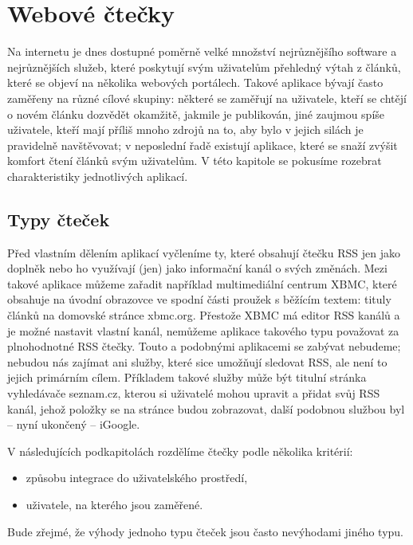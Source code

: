 \chapter{Webové čtečky}


Na internetu je dnes dostupné poměrně velké množství nejrůznějšího software a nejrůznějších služeb, které poskytují svým uživatelům přehledný výtah z článků, které se objeví na několika webových portálech.
Takové aplikace bývají často zaměřeny na různé cílové skupiny: některé se zaměřují na uživatele, kteří se chtějí o novém článku dozvědět okamžitě, jakmile je publikován, jiné zaujmou spíše uživatele, kteří mají příliš mnoho zdrojů na to, aby bylo v jejich silách je pravidelně navštěvovat; v neposlední řadě existují aplikace, které se snaží zvýšit komfort čtení článků svým uživatelům.
V této kapitole se pokusíme rozebrat charakteristiky jednotlivých aplikací.

\section{Typy čteček}

Před vlastním dělením aplikací vyčleníme ty, které obsahují čtečku RSS jen jako doplněk nebo ho využívají (jen) jako informační kanál o svých změnách.
Mezi takové aplikace můžeme zařadit například multimediální centrum XBMC, které obsahuje na úvodní obrazovce ve spodní části proužek s běžícím textem: tituly článků na domovské stránce xbmc.org.
Přestože XBMC má editor RSS kanálů a je možné nastavit vlastní kanál, nemůžeme aplikace takového typu považovat za plnohodnotné RSS čtečky.
Touto a podobnými aplikacemi se zabývat nebudeme; nebudou nás zajímat ani služby, které sice umožňují sledovat RSS, ale není to jejich primárním cílem.
Příkladem takové služby může být titulní stránka vyhledávače seznam.cz, kterou si uživatelé mohou upravit a přidat svůj RSS kanál, jehož položky se na stránce budou zobrazovat, další podobnou službou byl -- nyní ukončený -- iGoogle.

\bigskip

V následujících podkapitolách rozdělíme čtečky podle několika kritérií:
\begin{itemize}
	\item způsobu integrace do uživatelského prostředí,
	\item uživatele, na kterého jsou zaměřené.
\end{itemize}
Bude zřejmé, že výhody jednoho typu čteček jsou často nevýhodami jiného typu.

